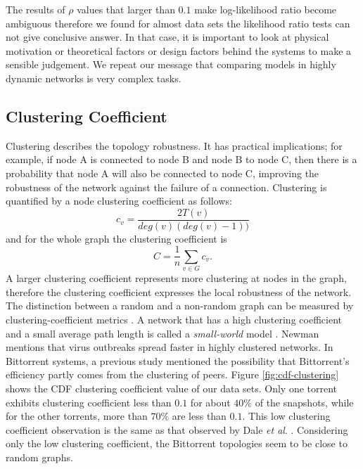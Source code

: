 \documentclass[paper]{ieice}
\begin{document}
The results of $\rho$ values that larger than $0.1$ make log-likelihood ratio become ambiguous therefore
we found for almost data sets the likelihood ratio tests can not give conclusive answer. 
In that case, it is important to look at physical motivation or theoretical factors or design factors behind the systems to make a sensible judgement. 
We repeat our message that comparing models in highly dynamic networks is very complex tasks.



\subsection{Clustering Coefficient}\label{clusteringcoef}

Clustering describes the topology robustness. 
It has practical implications; for example, if node A is connected to node B and node B to node C, then there is a probability that node A will also be
connected to node C, improving the robustness of the network against the failure of a connection.  
Clustering is quantified by a node clustering coefficient as follows:
\begin{equation}
c_v = \frac{2T(v)}{deg(v) (deg(v)-1))}
\end{equation} 
and for the whole graph the clustering coefficient is
\begin{equation}
C = \frac{1}{n} \sum_{v \in G} c_v.
\end{equation}
A larger clustering coefficient represents more clustering at nodes in the graph, therefore the clustering coefficient expresses the local robustness of the network.
The distinction between a random and a non-random graph can be measured by clustering-coefficient metrics \cite{watts1998collective}.
A network that has a high clustering coefficient and a small average path length is called a \textit{small-world} model \cite{watts1998collective}.
Newman \cite{newman2003properties} mentions that virus outbreaks spread faster in highly clustered networks. 
In Bittorrent systems, a previous study \cite{legout2007clustering} mentioned the possibility that Bittorrent's efficiency partly comes from the clustering of peers.
Figure \ref{fig:cdf-clustering} shows the CDF clustering coefficient value of our data sets.
Only one torrent exhibits clustering coefficient less than $0.1$ for about $40\%$ of the snapshots, while for the other torrents, more than  $70\%$ are less than $0.1$.
This low clustering coefficient observation is the same as that observed by Dale \textit{et al}. \cite{dale2008evolution}.
Considering only the low clustering coefficient, the Bittorrent topologies seem to be close to random graphs.
\end{document}
